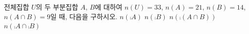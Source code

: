 전체집합 $U$의 두 부분집합 $A$, $B$에 대하여 $n(U)=33$, $n(A)=21$, $n(B)=14$, $n(A\cap B)=9$일 때, 다음을 구하시오.
 $n(\comp{A})$
 $n(\comp{B})$
 $n(\comp{(A\cap B)})$
 $n(\comp{A}\cap\comp{B})$
